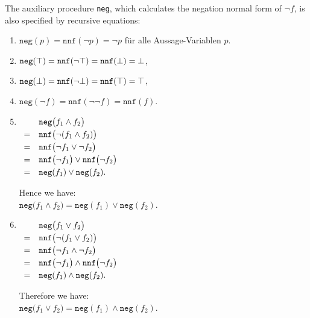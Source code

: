 The auxiliary procedure \texttt{neg}, which calculates the negation normal form of $\neg f$,
is also specified by recursive equations: 
\begin{enumerate}
\item $\texttt{neg}(p) = \texttt{nnf}(\neg p) = \neg p$ für alle Aussage-Variablen $p$.
\item $\texttt{neg}(\top) = \texttt{nnf}(\neg\top) = \texttt{nnf}(\bot) = \bot$, 
\item $\texttt{neg}(\bot) = \texttt{nnf}(\neg\bot) = \texttt{nnf}(\top) = \top$,
\item $\texttt{neg}(\neg f) = \texttt{nnf}(\neg \neg f) = \texttt{nnf}(f)$.
\item $\begin{array}[t]{cl}
         & \texttt{neg}\bigl(f_1 \wedge f_2 \bigr) \\[0.1cm]
       = & \texttt{nnf}\bigl(\neg(f_1 \wedge f_2)\bigr) \\[0.1cm]
       = & \texttt{nnf}\bigl(\neg f_1 \vee \neg f_2\bigr) \\[0.1cm]
       = & \texttt{nnf}\bigl(\neg f_1\bigr) \vee \texttt{nnf}\bigl(\neg f_2\bigr) \\[0.1cm]
       = & \texttt{neg}(f_1) \vee \texttt{neg}(f_2).
       \end{array}
      $

      Hence we have:
      \\[0.2cm]
      \hspace*{1.3cm}
      $\texttt{neg}\bigl(f_1 \wedge f_2 \bigr) = \texttt{neg}(f_1) \vee \texttt{neg}(f_2)$.
\item $\begin{array}[t]{cl}
         & \texttt{neg}\bigl(f_1 \vee f_2 \bigr)        \\[0.1cm]
       = & \texttt{nnf}\bigl(\neg(f_1 \vee f_2) \bigr)  \\[0.1cm]
       = & \texttt{nnf}\bigl(\neg f_1 \wedge \neg f_2 \bigr)  \\[0.1cm]
       = & \texttt{nnf}\bigl(\neg f_1\bigr) \wedge \texttt{nnf}\bigl(\neg f_2 \bigr)  \\[0.1cm]
       = & \texttt{neg}(f_1) \wedge \texttt{neg}(f_2). 
       \end{array}
      $

      Therefore we have: 
      \\[0.2cm]
      \hspace*{1.3cm}
      $\texttt{neg}\bigl(f_1 \vee f_2 \bigr) = \texttt{neg}(f_1) \wedge \texttt{neg}(f_2)$.
\end{enumerate}

